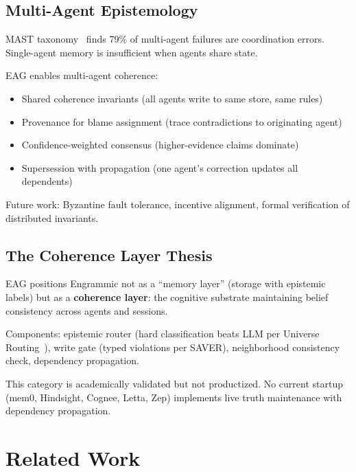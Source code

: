 \documentclass[11pt,a4paper]{article}
\begin{document}
\subsection{Multi-Agent Epistemology}

MAST taxonomy~\cite{mast2025} finds 79\% of multi-agent failures are coordination errors. Single-agent memory is insufficient when agents share state.

EAG enables multi-agent coherence:
\begin{itemize}[noitemsep]
    \item Shared coherence invariants (all agents write to same store, same rules)
    \item Provenance for blame assignment (trace contradictions to originating agent)
    \item Confidence-weighted consensus (higher-evidence claims dominate)
    \item Supersession with propagation (one agent's correction updates all dependents)
\end{itemize}

Future work: Byzantine fault tolerance, incentive alignment, formal verification of distributed invariants.

\subsection{The Coherence Layer Thesis}

EAG positions Engrammic not as a ``memory layer'' (storage with epistemic labels) but as a \textbf{coherence layer}: the cognitive substrate maintaining belief consistency across agents and sessions.

Components: epistemic router (hard classification beats LLM per Universe Routing~\cite{universe2026}), write gate (typed violations per SAVER), neighborhood consistency check, dependency propagation.

This category is academically validated but not productized. No current startup (mem0, Hindsight, Cognee, Letta, Zep) implements live truth maintenance with dependency propagation.

\section{Related Work}
\end{document}
